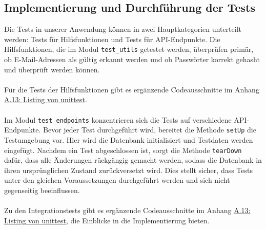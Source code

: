 \documentclass[a4paper,12pt]{article}
\begin{document}
\subsection{Implementierung und Durchführung der Tests}
Die Tests in unserer Anwendung können in zwei Hauptkategorien unterteilt werden: Tests für Hilfsfunktionen und Tests für API-Endpunkte. Die Hilfsfunktionen, die im Modul \texttt{test\_utils} getestet werden, überprüfen primär, ob E-Mail-Adressen als gültig erkannt werden und ob Passwörter korrekt gehasht und überprüft werden können.\\
\\
Für die Tests der Hilfsfunktionen gibt es ergänzende Codeausschnitte im Anhang \hyperref[sec:unittest]{A.13: Listing von unittest}.\\
\\
Im Modul \texttt{test\_endpoints} konzentrieren sich die Tests auf verschiedene API-Endpunkte. Bevor jeder Test durchgeführt wird, bereitet die Methode \texttt{setUp} die Testumgebung vor. Hier wird die Datenbank initialisiert und Testdaten werden eingefügt. Nachdem ein Test abgeschlossen ist, sorgt die Methode \texttt{tearDown} dafür, dass alle Änderungen rückgängig gemacht werden, sodass die Datenbank in ihren ursprünglichen Zustand zurückversetzt wird. Dies stellt sicher, dass Tests unter den gleichen Voraussetzungen durchgeführt werden und sich nicht gegenseitig beeinflussen.\\
\\
Zu den Integrationstests gibt es ergänzende Codeausschnitte im Anhang \hyperref[sec:unittest]{A.13: Listing von unittest}, die Einblicke in die Implementierung bieten.
\end{document}

